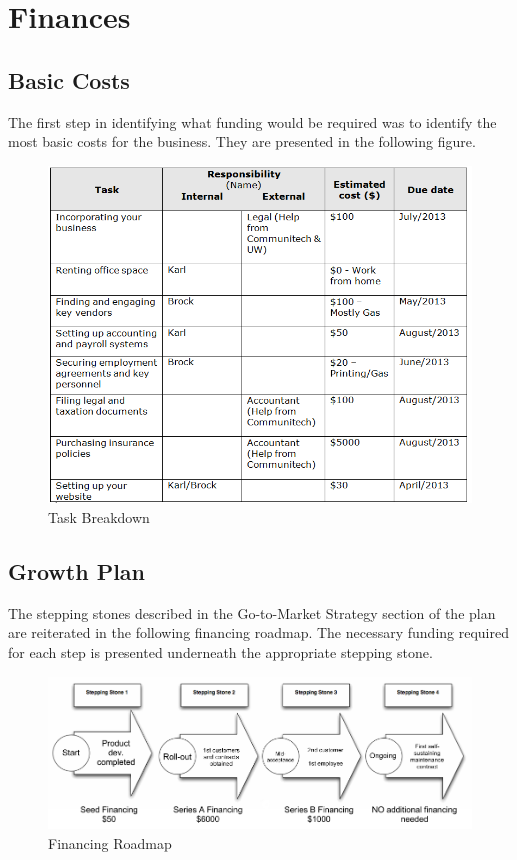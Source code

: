 \section{Finances}

\subsection{Basic Costs}
The first step in identifying what funding would be required was to identify the most basic costs for the business. They are presented in the following figure.

\begin{figure}[ht!]
\centering
\includegraphics[width=150mm]{images/TaskList.png}
\caption{Task Breakdown}
\label{tasks}
\end{figure}

\subsection{Growth Plan}
The stepping stones described in the Go-to-Market Strategy section of the plan are reiterated in the following financing roadmap. The necessary funding required for each step is presented underneath the appropriate stepping stone.

\begin{figure}[ht!]
\centering
\includegraphics[width=150mm]{images/MSCI454-FinancingRoadmap.png}
\caption{Financing Roadmap}
\label{steppingStones}
\end{figure}
 
